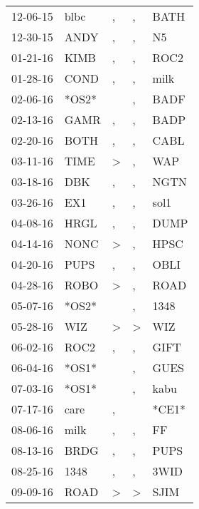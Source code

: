 \begin{supertabular}{lllll}
 12-06-15 &   blbc &                , &                , &   BATH \\
 12-30-15 &   ANDY &                , &                , &     N5 \\
 01-21-16 &   KIMB &                , &                , &   ROC2 \\
 01-28-16 &   COND &                , &                , &   milk \\
 02-06-16 &  *OS2* &                  &                , &   BADF \\
 02-13-16 &   GAMR &                , &                , &   BADP \\
 02-20-16 &   BOTH &                , &                , &   CABL \\
 03-11-16 &   TIME &     \textgreater &                , &    WAP \\
 03-18-16 &    DBK &                , &                , &   NGTN \\
 03-26-16 &    EX1 &                , &                , &   sol1 \\
 04-08-16 &   HRGL &                , &                , &   DUMP \\
 04-14-16 &   NONC &     \textgreater &                , &   HPSC \\
 04-20-16 &   PUPS &                , &                , &   OBLI \\
 04-28-16 &   ROBO &     \textgreater &                , &   ROAD \\
 05-07-16 &  *OS2* &                  &                , &   1348 \\
 05-28-16 &    WIZ &     \textgreater &     \textgreater &    WIZ \\
 06-02-16 &   ROC2 &                , &                , &   GIFT \\
 06-04-16 &  *OS1* &                  &                , &   GUES \\
 07-03-16 &  *OS1* &                  &                , &   kabu \\
 07-17-16 &   care &                , &                  &  *CE1* \\
 08-06-16 &   milk &                , &                , &     FF \\
 08-13-16 &   BRDG &                , &                , &   PUPS \\
 08-25-16 &   1348 &                , &                , &   3WID \\
 09-09-16 &   ROAD &     \textgreater &     \textgreater &   SJIM \\

\end{supertabular}
